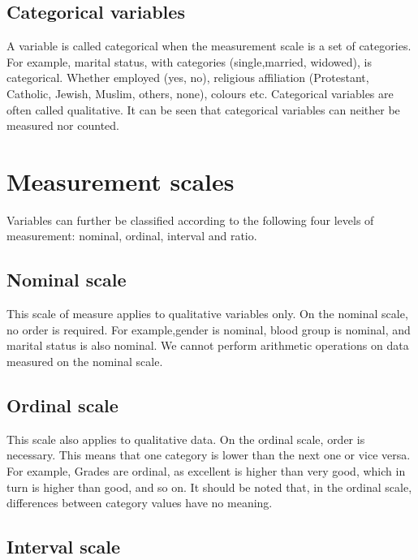 \documentclass[
]{book}
\begin{document}
\hypertarget{categorical-variables}{%
\subsection{Categorical variables}\label{categorical-variables}}

A variable is called categorical when the measurement scale is a set of
categories. For example, marital status, with categories
(single,married, widowed), is categorical. Whether employed (yes, no),
religious affiliation (Protestant, Catholic, Jewish, Muslim, others,
none), colours etc. Categorical variables are often called qualitative.
It can be seen that categorical variables can neither be measured nor
counted.

\hypertarget{measurement-scales}{%
\section{Measurement scales}\label{measurement-scales}}

Variables can further be classified according to the following four
levels of measurement: nominal, ordinal, interval and ratio.

\hypertarget{nominal-scale}{%
\subsection{Nominal scale}\label{nominal-scale}}

This scale of measure applies to qualitative variables only. On the
nominal scale, no order is required. For example,gender is nominal,
blood group is nominal, and marital status is also nominal. We cannot
perform arithmetic operations on data measured on the nominal scale.

\hypertarget{ordinal-scale}{%
\subsection{Ordinal scale}\label{ordinal-scale}}

This scale also applies to qualitative data. On the ordinal scale, order
is necessary. This means that one category is lower than the next one or
vice versa. For example, Grades are ordinal, as excellent is higher than
very good, which in turn is higher than good, and so on. It should be
noted that, in the ordinal scale, differences between category values
have no meaning.

\hypertarget{interval-scale}{%
\subsection{Interval scale}\label{interval-scale}}
\end{document}

